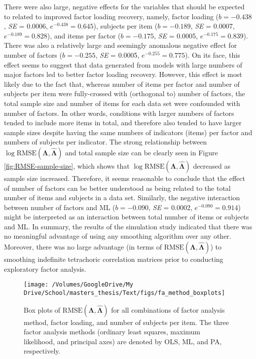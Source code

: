 \documentclass[
  english,
  man]{apa6}
\begin{document}
There were also large, negative effects for the variables that should be expected to related to improved factor loading recovery, namely, factor loading (\(b = -0.438\), \emph{SE} = 0.0006, \(e^{-0.438} = 0.645\)), subjects per item (\(b = -0.189\), \emph{SE} = 0.0007, \(e^{-0.189} = 0.828\)), and items per factor (\(b = -0.175\), \emph{SE} = 0.0005, \(e^{-0.175} = 0.839\)). There was also a relatively large and seemingly anomalous negative effect for number of factors (\(b = -0.255\), \emph{SE} = 0.0005, \(e^{-0.255} = 0.775\)). On its face, this effect seems to suggest that data generated from models with large numbers of major factors led to better factor loading recovery. However, this effect is most likely due to the fact that, whereas number of items per factor and number of subjects per item were fully-crossed with (orthogonal to) number of factors, the total sample size and number of items for each data set were confounded with number of factors. In other words, conditions with larger numbers of factors tended to include more items in total, and therefore also tended to have larger sample sizes despite having the same numbers of indicators (items) per factor and numbers of subjects per indicator. The strong relationship between \(\log \textrm{RMSE}(\mathbf{\Lambda}, \hat{\mathbf{\Lambda}})\) and total sample size can be clearly seen in Figure \ref{fig:RMSE-sample-size}, which shows that \(\log \textrm{RMSE}(\mathbf{\Lambda}, \hat{\mathbf{\Lambda}})\) decreased as sample size increased. Therefore, it seems reasonable to conclude that the effect of number of factors can be better understood as being related to the total number of items and subjects in a data set. Similarly, the negative interaction between number of factors and ML (\(b = -0.090\), \emph{SE} = 0.0002, \(e^{-0.090} = 0.914\)) might be interpreted as an interaction between total number of items or subjects and ML. In summary, the results of the simulation study indicated that there was no meaningful advantage of using any smoothing algorithm over any other. Moreover, there was no large advantage (in terms of \(\textrm{RMSE}(\mathbf{\Lambda}, \hat{\mathbf{\Lambda}})\)) to smoothing indefinite tetrachoric correlation matrices prior to conducting exploratory factor analysis.

\begin{figure}

{\centering \texttt{[image: /Volumes/GoogleDrive/My Drive/School/masters\_thesis/Text/figs/fa\_method\_boxplots]} 

}

\caption{Box plots of $\textrm{RMSE}(\mathbf{\Lambda}, \hat{\mathbf{\Lambda}})$ for all combinations of factor analysis method, factor loading, and number of subjects per item. The three factor analysis methods (ordinary least squares, maximum likelihood, and principal axes) are denoted by OLS, ML, and PA, respectively.}\label{fig:fa-method-boxplots}
\end{figure}
\end{document}
